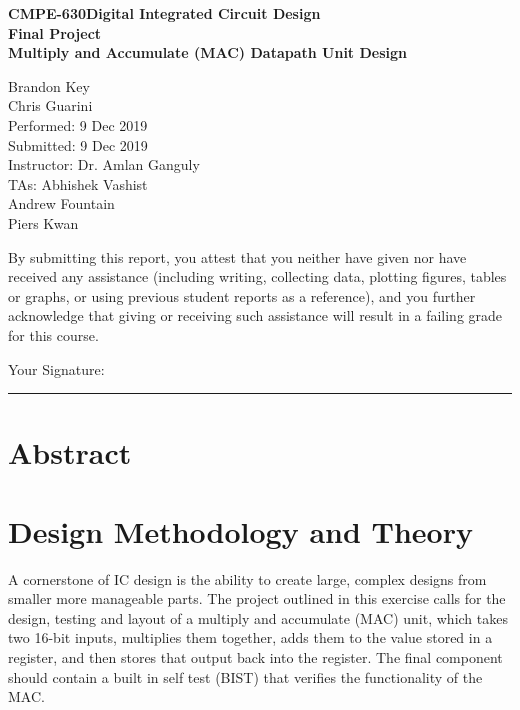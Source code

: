 \documentclass[11pt]{article}
\newcommand{\ClassNameS}{CMPE-630}
\newcommand{\ClassNameL}{Digital Integrated Circuit Design}
\newcommand{\ExerciseName}{Final Project}
\newcommand{\SubTitle}{Multiply and Accumulate (MAC) Datapath Unit Design}
\newcommand{\DueDate}{9 Dec 2019}
\begin{document}
\thispagestyle{empty}

%
%

\vspace*{2 cm}

\begin{center}
\bf{\ClassNameS \space \ClassNameL\\
    \ExerciseName\\
\vspace{0.25 cm}
\SubTitle
}
\end{center}

\vspace{4 cm}

\begin{flushright}
Brandon Key\\
Chris Guarini\\
Performed: 9 Dec 2019\\
Submitted: \DueDate\\
\vspace{0.5 cm}
Instructor: Dr. Amlan Ganguly\\
TAs: Abhishek Vashist\\
Andrew Fountain\\
Piers Kwan\\
\vspace{0.5 cm}
\end{flushright}

\vspace{3 cm}
\indent By submitting this report, you attest that you neither have given nor have received any assistance (including writing, collecting data, plotting figures, tables or graphs, or using previous student reports as a reference), and you further acknowledge that giving or receiving such assistance will result in a failing grade for this course.

\vspace{1 cm}
Your Signature:   \rule{13cm}{.1pt}

\newpage
\tableofcontents
\newpage

\section{Abstract}

	
	

\section{Design Methodology and Theory}

	A cornerstone of IC design is the ability to create large, complex designs from smaller more manageable parts. The project outlined in this exercise calls for the design, testing and layout of a multiply and accumulate (MAC) unit, which takes two 16-bit inputs, multiplies them together, adds them to the value stored in a register, and then stores that output back into the register. The final component should contain a built in self test (BIST) that verifies the functionality of the MAC.
	
\end{document}
